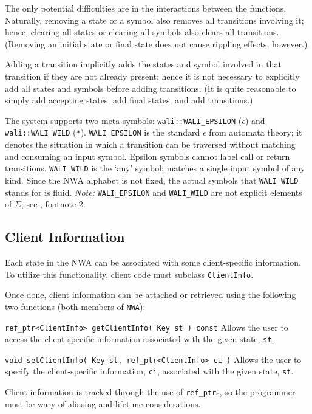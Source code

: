 The only potential difficulties are in the interactions between the
functions. Naturally, removing a state or a symbol also removes all
transitions involving it; hence, clearing all states or clearing all symbols
also clears all transitions. (Removing an initial state or final state
does not cause rippling effects, however.)

Adding a transition implicitly adds the states and symbol involved in that
transition if they are not already present; hence it is not necessary to
explicitly add all states and symbols before adding transitions. (It is quite
reasonable to simply add accepting states, add final states, and add
transitions.)


The system supports two meta-symbols: \texttt{wali::WALI\_EPSILON}
(\texttt{$\epsilon$}) and \texttt{wali::WALI\_WILD} (\texttt{*}).
\texttt{WALI\_EPSILON} is the standard $\epsilon$ from automata theory; it
denotes the situation in which a transition can be traversed without matching
and consuming an input symbol.  Epsilon symbols cannot label call or return
transitions. \texttt{WALI\_WILD} is the `any' symbol; matches a single input
symbol of any kind.  Since the NWA alphabet is not fixed, the actual symbols
that \texttt{WALI\_WILD} stands for is fluid.  \textsl{Note:}
\texttt{WALI\_EPSILON} and \texttt{WALI\_WILD} are not explicit
elements of $\Sigma$; see , footnote 2. 



\subsection{Client Information}
\label{Se:client-info}

Each state in the NWA can be associated with some client-specific
information. To utilize this functionality, client code must subclass
\texttt{ClientInfo}. 

Once done, client information can be attached or retrieved using the
following two functions (both members of \texttt{NWA}):
\begin{description}
  \item\texttt{ref\_ptr<ClientInfo> getClientInfo( Key st ) const} \nopagebreak
    Allows the user to access the client-specific information associated with
    the given state, \texttt{st}.
  \item\texttt{void setClientInfo( Key st, ref\_ptr<ClientInfo> ci )} \nopagebreak
    Allows the user to specify the client-specific information, \texttt{ci},
    associated with the given state, \texttt{st}. \\
\end{description}
Client information is tracked through the use of \texttt{ref\_ptr}s, so the
programmer must be wary of aliasing and lifetime considerations.


